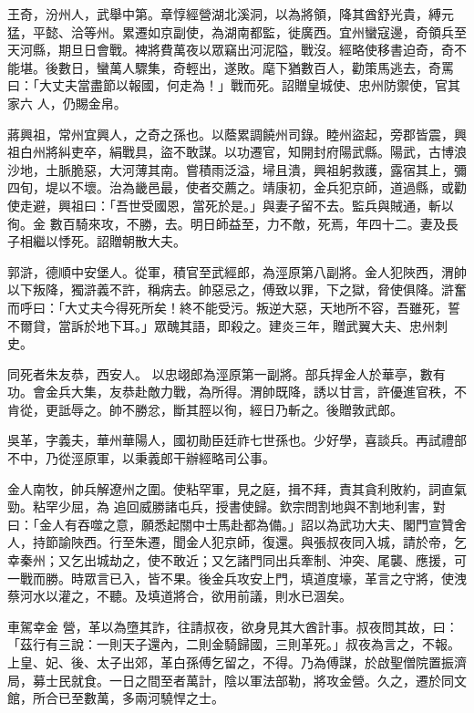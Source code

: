 \begin{pinyinscope}
 王奇，汾州人，武舉中第。章惇經營湖北溪洞，以為將領，降其酋舒光貴，縛元猛，平懿、洽等州。累遷如京副使，為湖南都監，徙廣西。宜州蠻寇邊，奇領兵至天河縣，期旦日會戰。裨將費萬夜以眾竊出河泥隘，戰沒。經略使移書迫奇，奇不能堪。後數日，蠻萬人驟集，奇輕出，遂敗。麾下猶數百人，勸策馬逃去，奇罵曰：「大丈夫當盡節以報國，何走為！」戰而死。詔贈皇城使、忠州防禦使，官其家六
 人，仍賜金帛。



 蔣興祖，常州宜興人，之奇之孫也。以蔭累調饒州司錄。睦州盜起，旁郡皆震，興祖白州將糾吏卒，絹戰具，盜不敢謀。以功遷官，知開封府陽武縣。陽武，古博浪沙地，土脈脆惡，大河薄其南。嘗積雨泛溢，埽且潰，興祖躬救護，露宿其上，彌四旬，堤以不壞。治為畿邑最，使者交薦之。靖康初，金兵犯京師，道過縣，或勸使走避，興祖曰：「吾世受國恩，當死於是。」與妻子留不去。監兵與賊通，斬以徇。金
 數百騎來攻，不勝，去。明日師益至，力不敵，死焉，年四十二。妻及長子相繼以悸死。詔贈朝散大夫。



 郭滸，德順中安堡人。從軍，積官至武經郎，為涇原第八副將。金人犯陜西，渭帥以下叛降，獨滸義不許，稱病去。帥惡忌之，傅致以罪，下之獄，脅使俱降。滸奮而呼曰：「大丈夫今得死所矣！終不能受污。叛逆大惡，天地所不容，吾雖死，誓不爾貸，當訴於地下耳。」眾醜其語，即殺之。建炎三年，贈武翼大夫、忠州刺史。



 同死者朱友恭，西安人。
 以忠翊郎為涇原第一副將。部兵捍金人於華亭，數有功。會金兵大集，友恭赴敵力戰，為所得。渭帥既降，誘以甘言，許優進官秩，不肯從，更詆辱之。帥不勝忿，斷其脛以徇，經日乃斬之。後贈敦武郎。



 吳革，字義夫，華州華陽人，國初勛臣廷祚七世孫也。少好學，喜談兵。再試禮部不中，乃從涇原軍，以秉義郎干辦經略司公事。



 金人南牧，帥兵解遼州之圍。使粘罕軍，見之庭，揖不拜，責其貪利敗約，詞直氣勁。粘罕少屈，為
 追回威勝諸屯兵，授書使歸。欽宗問割地與不割地利害，對曰：「金人有吞噬之意，願悉起關中士馬赴都為備。」詔以為武功大夫、閣門宣贊舍人，持節諭陜西。行至朱遷，聞金人犯京師，復還。與張叔夜同入城，請於帝，乞幸秦州；又乞出城劫之，使不敢近；又乞諸門同出兵牽制、沖突、尾襲、應援，可一戰而勝。時眾言已入，皆不果。後金兵攻安上門，填道度壕，革言之守將，使洩蔡河水以灌之，不聽。及填道將合，欲用前議，則水已涸矣。



 車駕幸金
 營，革以為墮其詐，往請叔夜，欲身見其大酋計事。叔夜問其故，曰：「茲行有三說：一則天子還內，二則金騎歸國，三則革死。」叔夜為言之，不報。上皇、妃、後、太子出郊，革白孫傅乞留之，不得。乃為傅謀，於啟聖僧院置振濟局，募士民就食。一日之間至者萬計，陰以軍法部勒，將攻金營。久之，遷於同文館，所合已至數萬，多兩河驍悍之士。




\end{pinyinscope}
